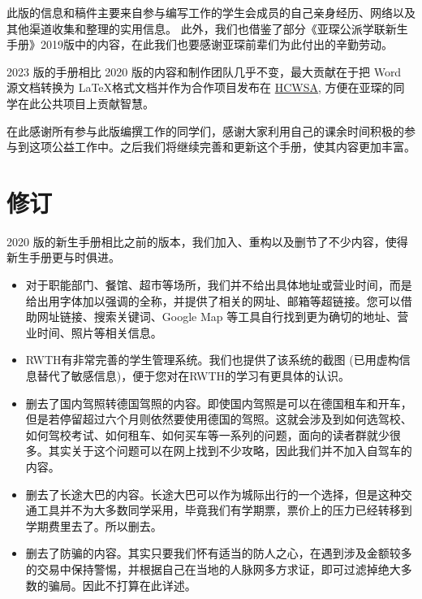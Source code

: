   此版的信息和稿件主要来自参与编写工作的学生会成员的自己亲身经历、网络以及其他渠道收集和整理的实用信息。 此外，我们也借鉴了部分《亚琛公派学联新生手册》2019版中的内容，在此我们也要感谢亚琛前辈们为此付出的辛勤劳动。

  2023 版的手册相比 2020 版的内容和制作团队几乎不变，最大贡献在于把 Word 源文档转换为 \LaTeX 格式文档并作为合作项目发布在 \href{https://github.com/OChicken/HCWSA}{HCWSA}, 方便在亚琛的同学在此公共项目上贡献智慧。

  在此感谢所有参与此版编撰工作的同学们，感谢大家利用自己的课余时间积极的参与到这项公益工作中。之后我们将继续完善和更新这个手册，使其内容更加丰富。



  \newpage

\chapter*{修订}


  2020 版的新生手册相比之前的版本，我们加入、重构以及删节了不少内容，使得新生手册更与时俱进。

  \begin{itemize}
    \item 对于职能部门、餐馆、超市等场所，我们并不给出具体地址或营业时间，而是给出用字体加以强调的全称，并提供了相关的网址、邮箱等超链接。您可以借助网址链接、搜索关键词、Google Map 等工具自行找到更为确切的地址、营业时间、照片等相关信息。
    \item RWTH有非常完善的学生管理系统。我们也提供了该系统的截图 (已用虚构信息替代了敏感信息)，便于您对在RWTH的学习有更具体的认识。
    \item 删去了国内驾照转德国驾照的内容。即使国内驾照是可以在德国租车和开车，但是若停留超过六个月则依然要使用德国的驾照。这就会涉及到如何选驾校、如何驾校考试、如何租车、如何买车等一系列的问题，面向的读者群就少很多。其实关于这个问题可以在网上找到不少攻略，因此我们并不加入自驾车的内容。
    \item 删去了长途大巴的内容。长途大巴可以作为城际出行的一个选择，但是这种交通工具并不为大多数同学采用，毕竟我们有学期票，票价上的压力已经转移到学期费里去了。所以删去。
    \item 删去了防骗的内容。其实只要我们怀有适当的防人之心，在遇到涉及金额较多的交易中保持警惕，并根据自己在当地的人脉网多方求证，即可过滤掉绝大多数的骗局。因此不打算在此详述。
  \end{itemize}

